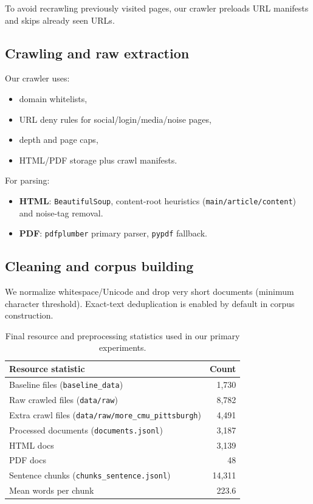 \documentclass[11pt,twocolumn]{article}
\begin{document}
To avoid recrawling previously visited pages, our crawler preloads URL manifests and skips already seen URLs.

\subsection{Crawling and raw extraction}
Our crawler uses:
\begin{itemize}
    \item domain whitelists,
    \item URL deny rules for social/login/media/noise pages,
    \item depth and page caps,
    \item HTML/PDF storage plus crawl manifests.
\end{itemize}

For parsing:
\begin{itemize}
    \item \textbf{HTML}: \texttt{BeautifulSoup}, content-root heuristics (\texttt{main/article/content}) and noise-tag removal.
    \item \textbf{PDF}: \texttt{pdfplumber} primary parser, \texttt{pypdf} fallback.
\end{itemize}

\subsection{Cleaning and corpus building}
We normalize whitespace/Unicode and drop very short documents (minimum character threshold). Exact-text deduplication is enabled by default in corpus construction.

\begin{table}[t]
\centering
\small
\begin{tabular}{l r}
\toprule
\textbf{Resource statistic} & \textbf{Count} \\
\midrule
Baseline files (\texttt{baseline\_data}) & 1,730 \\
Raw crawled files (\texttt{data/raw}) & 8,782 \\
Extra crawl files (\texttt{data/raw/more\_cmu\_pittsburgh}) & 4,491 \\
Processed documents (\texttt{documents.jsonl}) & 3,187 \\
\quad HTML docs & 3,139 \\
\quad PDF docs & 48 \\
Sentence chunks (\texttt{chunks\_sentence.jsonl}) & 14,311 \\
Mean words per chunk & 223.6 \\
\bottomrule
\end{tabular}
\caption{Final resource and preprocessing statistics used in our primary experiments.}
\label{tab:data_stats}
\end{table}
\end{document}
